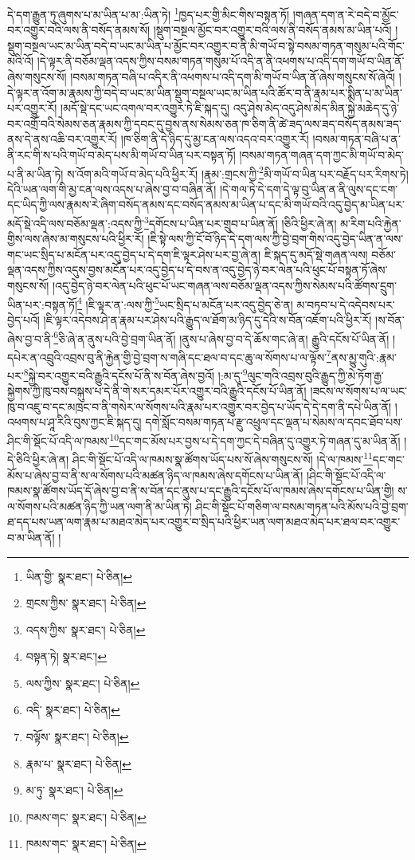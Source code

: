 དེ་དག་རྒྱུན་ཏུ་ཞུགས་པ་མ་ཡིན་པ་མ་:ཡིན་ཏེ། \footnote{ཡིན་གྱི་  སྣར་ཐང་།  པེ་ཅིན། }ཁྱད་པར་གྱི་མིང་གིས་བསྟན་ཏོ། །གཞན་དག་ན་རེ་བདེ་བ་མྱོང་བར་འགྱུར་བའི་ལས་ནི་བསོད་ནམས་སོ། །སྡུག་བསྔལ་མྱོང་བར་འགྱུར་བའི་ལས་ནི་བསོད་ནམས་མ་ཡིན་པའོ། །སྡུག་བསྔལ་ཡང་མ་ཡིན་བདེ་བ་ཡང་མ་ཡིན་པ་མྱོང་བར་འགྱུར་བ་ནི་མི་གཡོ་བ་སྟེ་བསམ་གཏན་གསུམ་པའི་གོང་མའི་འོ། །དེ་ལྟར་ནི་བཅོམ་ལྡན་འདས་ཀྱིས་བསམ་གཏན་གསུམ་པོ་འདི་ན་ནི་འཕགས་པ་འདི་དག་གཡོ་བ་ཡིན་ནོ་ཞེས་གསུངས་སོ། །བསམ་གཏན་བཞི་པ་འདིར་ནི་འཕགས་པ་འདི་དག་མི་གཡོ་བ་ཡིན་ནོ་ཞེས་གསུངས་སོ་ཞེའོ། །དེ་ལྟར་ན་འོག་མ་རྣམས་ཀྱི་བདེ་བ་ཡང་མ་ཡིན་སྡུག་བསྔལ་ཡང་མ་ཡིན་པའི་ཚོར་བ་ནི་རྣམ་པར་སྨིན་པ་མ་ཡིན་པར་འགྱུར་རོ། །མདོ་སྡེ་དང་ཡང་འགལ་བར་འགྱུར་ཏེ་ཇི་སྐད་དུ། འདུ་ཤེས་མེད་འདུ་ཤེས་མེད་མིན་སྐྱེ་མཆེད་དུ་ཉེ་བར་འགྲོ་བའི་སེམས་ཅན་རྣམས་ཀྱི་དབང་དུ་བྱས་ནས་སེམས་ཅན་ཁ་ཅིག་ནི་ཚེ་ཟད་ལས་ཟད་བསོད་ནམས་ཟད་ནས་དེ་ནས་འཆི་བར་འགྱུར་རོ། །ཁ་ཅིག་ནི་དེ་ཉིད་དུ་མྱ་ངན་ལས་འདའ་བར་འགྱུར་རོ། །བསམ་གཏན་བཞི་པ་ན་ནི་རང་གི་ས་པའི་གཡོ་བ་མེད་པས་མི་གཡོ་བ་ཡིན་པར་བསྟན་ཏོ། །བསམ་གཏན་གཞན་དག་ཀྱང་མི་གཡོ་བ་མེད་པ་ནི་མ་ཡིན་ཏེ། ས་འོག་མའི་གཡོ་བ་མེད་པའི་ཕྱིར་རོ། །རྣམ་:གྲངས་ཀྱི་\footnote{གྲངས་ཀྱིས་  སྣར་ཐང་།  པེ་ཅིན། }མི་གཡོ་བ་ཡིན་པར་བརྗོད་པར་རིགས་ཏེ། དེའི་ཡན་ལག་གི་མྱ་ངན་ལས་འདས་པ་ཞེས་བྱ་བ་བཞིན་ནོ། །དེ་གལ་ཏེ་དེ་དག་དེ་ལྟ་བུ་ཡིན་ན་ནི་ལུས་དང་ངག་དང་ཡིད་ཀྱི་ལས་རྣམས་རེ་ཞིག་བསོད་ནམས་དང་བསོད་ནམས་མ་ཡིན་པ་དང་མི་གཡོ་བའི་འདུ་བྱེད་མ་ཡིན་པར་མདོ་སྡེ་འདི་ལས་བཅོམ་ལྡན་:འདས་ཀྱི་\footnote{འདས་ཀྱིས་  སྣར་ཐང་།  པེ་ཅིན། }དགོངས་པ་ཡིན་པར་གྲུབ་པ་ཡིན་ནོ། །ཅིའི་ཕྱིར་ཞེ་ན། མ་རིག་པའི་རྐྱེན་གྱིས་ལས་ཞེས་མ་གསུངས་པའི་ཕྱིར་རོ། །ཇི་སྟེ་ལས་ཀྱི་ངོ་བོ་ཉིད་དེ་དག་ལས་ཀྱི་བྱེ་བྲག་གིས་འདུ་བྱེད་ཡིན་ན་ལས་གང་ཡང་སྲིད་པ་མངོན་པར་འདུ་བྱེད་པ་དེ་དག་ཇི་ལྟར་ཤེས་པར་བྱ་ཞེ་ན། ཇི་སྐད་དུ་མདོ་སྡེ་གཞན་ལས། བཅོམ་ལྡན་འདས་ཀྱིས་འདུས་བྱས་མངོན་པར་འདུ་བྱེད་པ་དེ་བས་ན་འདུ་བྱེད་ཉེ་བར་ལེན་པའི་ཕུང་པོ་བསྟན་ཏོ་ཞེས་གསུངས་སོ། །འདུ་བྱེད་ཉེ་བར་ལེན་པའི་ཕུང་པོ་ཡང་གཞན་ལས་བཅོམ་ལྡན་འདས་ཀྱིས་སེམས་པའི་ཚོགས་དྲུག་ཡིན་པར་:བསྟན་ཏོ།\footnote{བསྟན་ཏེ།  སྣར་ཐང་། } །ཇི་ལྟར་ན་:ལས་ཀྱི་\footnote{ལས་ཀྱིས་  སྣར་ཐང་།  པེ་ཅིན། }ཡང་སྲིད་པ་མངོན་པར་འདུ་བྱེད་ཅེ་ན། མ་བཏབ་པ་དེ་འདེབས་པར་བྱེད་པའོ། །ཇི་ལྟར་འདེབས་ཤེ་ན་རྣམ་པར་ཤེས་པའི་རྒྱུད་ལ་ཐོག་མ་ཉིད་དུ་དེའི་ས་བོན་འཇོག་པའི་ཕྱིར་རོ། །ས་བོན་ཞེས་བྱ་བ་ནི་\footnote{འདི་  སྣར་ཐང་།  པེ་ཅིན། }ཅི་ཞེ་ན་ནུས་པའི་བྱེ་བྲག་ཡིན་ནོ། །ནུས་པ་ཞེས་བྱ་བ་དེ་ཆོས་གང་ཞེ་ན། རྒྱུའི་དངོས་པོ་ཡིན་ནོ། །དཔེར་ན་འབྲུའི་འབྲས་བུ་ནི་རྐྱེན་གྱི་བྱེ་བྲག་ས་གཞི་དང་ཐལ་བ་དང་ཆུ་ལ་སོགས་པ་ལ་ལྟོས་\footnote{བལྟོས་  སྣར་ཐང་།  པེ་ཅིན། }ནས་མྱུ་གུའི་:རྣམ་པར་\footnote{རྣམ་པ་  སྣར་ཐང་།  པེ་ཅིན། }སྐྱེ་བར་འགྱུར་བའི་རྒྱུའི་དངོས་པོ་ནི་ས་བོན་ཞེས་བྱའོ། །:མ་དུ་\footnote{མ་ཏུ་  སྣར་ཐང་།  པེ་ཅིན། }ལུང་གའི་འབྲས་བུའི་རྒྱུད་ཀྱི་མེ་ཏོག་རྒྱ་སྐྱེགས་ཀྱི་ཁུ་བས་བསྐུས་པ་དེ་ནི་གེ་སར་དམར་པོར་འགྱུར་བའི་རྒྱུའི་དངོས་པོ་ཡིན་ནོ། །ཟངས་ལ་སོགས་པ་ལ་ཡང་ཁུ་བ་འཇུ་བ་དང་མཁྲང་བ་ནི་གསེར་ལ་སོགས་པའི་རྣམ་པར་འགྱུར་བར་བྱེད་པ་ཡོད་དེ་དེ་དག་ནི་དཔེ་ཡིན་ནོ། །འཕགས་པ་ཤཱ་རིའི་བུས་ཀྱང་ཇི་སྐད་དུ། དགེ་སློང་བསམ་གཏན་པ་རྫུ་འཕྲུལ་དང་ལྡན་པ་སེམས་ལ་དབང་ཐོབ་པས་ཤིང་གི་སྡོང་པོ་འདི་ལ་ཁམས་\footnote{ཁམས་གང་  སྣར་ཐང་།  པེ་ཅིན། }དང་གང་མོས་པར་བྱས་པ་དེ་དག་ཀྱང་དེ་བཞིན་དུ་འགྱུར་ཏེ་གཞན་དུ་མ་ཡིན་ནོ། །དེ་ཅིའི་ཕྱིར་ཞེ་ན། ཤིང་གི་སྡོང་པོ་འདི་ལ་ཁམས་སྣ་ཚོགས་ཡོད་པས་སོ་ཞེས་གསུངས་སོ། །དེ་ལ་ཁམས་\footnote{ཁམས་གང་  སྣར་ཐང་།  པེ་ཅིན། }དང་གང་མོས་པ་ཞེས་བྱ་བ་ནི་ས་ལ་སོགས་པའི་མཚན་ཉིད་ལ་ཁམས་ཞེས་དགོངས་པ་ཡིན་ནོ། །ཤིང་གི་སྡོང་པོ་འདི་ལ་ཁམས་སྣ་ཚོགས་ཡོད་དོ་ཞེས་བྱ་བ་ནི་ས་བོན་དང་ནུས་པ་དང་རྒྱུའི་དངོས་པོ་ལ་ཁམས་ཞེས་དགོངས་པ་ཡིན་གྱི། ས་ལ་སོགས་པའི་མཚན་ཉིད་ཀྱི་ཡན་ལག་ནི་མ་ཡིན་ཏེ། ཤིང་གི་སྡོང་པོ་གཅིག་ལ་བསམ་གཏན་པའི་མོས་པའི་བྱེ་བྲག་ཐ་དད་པས་ཡན་ལག་རྣམ་པ་མཐའ་མེད་པར་འགྱུར་བ་སྲིད་པའི་ཕྱིར་ཡན་ལག་མཐའ་མེད་པར་ཐལ་བར་འགྱུར་བ་མ་ཡིན་ནོ། །
